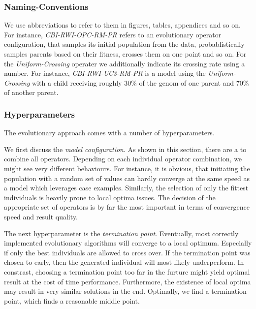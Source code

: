 \documentclass[./../../paper.tex]{subfiles}
\begin{document}
\subsubsection{Naming-Conventions}
We use abbreviations to refer to them in figures, tables, appendices and so on. For instance, \emph{CBI-RWI-OPC-RM-PR} refers to an evolutionary operator configuration, that samples its initial population from the data, probablistically samples parents based on their fitness, crosses them on one point and so on. For the \emph{Uniform-Crossing} operater we additionally indicate its crossing rate using a number. For instance, \emph{CBI-RWI-UC3-RM-PR} is a model using the \emph{Uniform-Crossing} with a child receiving roughly 30\% of the genom of one parent and 70\% of another parent.

\subsubsection{Hyperparameters}
The evolutionary approach comes with a number of hyperparameters. 

We first discuss the \emph{model configuration}. As shown in this section, there are a \NumEvoCombinations to combine all operators. Depending on each individual operator combination, we might see very different behaviours. For instance, it is obvious, that initiating the population with a random set of values can hardly converge at the same speed as a model which leverages case examples. Similarly, the selection of only the fittest individuals is heavily prone to local optima issues. The decision of the appropriate set of operators is by far the most important in terms of convergence speed and result quality.

The next hyperparameter is the \emph{termination point}. Eventually, most correctly implemented evolutionary algorithms will converge to a local optimum. Especially if only the best individuals are allowed to cross over. If the termination point was chosen to early, then the generated individual will most likely underperform. In constrast, choosing a termination point too far in the furture might yield optimal result at the cost of time performance. Furthermore, the existence of local optima may result in very similar solutions in the end. Optimally, we find a termination point, which finds a reasonable middle point.
\end{document}
